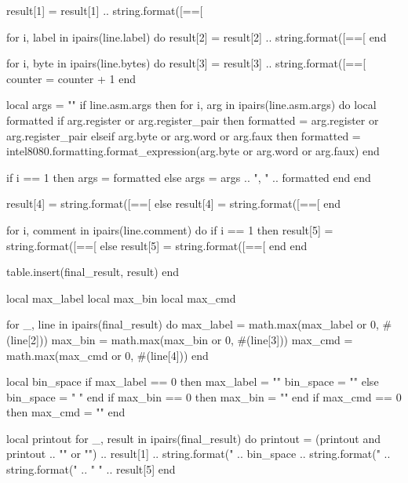         result[1] = result[1] .. string.format([==[%

        for i, label in ipairs(line.label) do
            result[2] = result[2] .. string.format([==[%
        end

        for i, byte in ipairs(line.bytes) do
            result[3] = result[3] .. string.format([==[%
            counter = counter + 1
        end

        local args = ""
        if line.asm.args then
            for i, arg in ipairs(line.asm.args) do
                local formatted
                if arg.register or arg.register_pair then
                    formatted = arg.register or arg.register_pair
                elseif arg.byte or arg.word or arg.faux then
                    formatted = intel8080.formatting.format_expression(arg.byte or arg.word or arg.faux)
                end

                if i == 1 then
                    args = formatted
                else
                    args = args .. ", " .. formatted
                end
            end

            result[4] = string.format([==[%
        else
            result[4] = string.format([==[%
        end

        for i, comment in ipairs(line.comment) do
            if i == 1 then
                result[5] = string.format([==[%
            else
                result[5] = string.format([==[ %
            end
        end

        table.insert(final_result, result)
    end

    local max_label
    local max_bin
    local max_cmd

    for _, line in ipairs(final_result) do
        max_label = math.max(max_label or 0, #(line[2]))
        max_bin = math.max(max_bin or 0, #(line[3]))
        max_cmd = math.max(max_cmd or 0, #(line[4]))
    end

    local bin_space
    if max_label == 0 then
        max_label = ""
        bin_space = ""
    else
        bin_space = "    "
    end
    if max_bin == 0 then
        max_bin = ""
    end
    if max_cmd == 0 then
        max_cmd = ""
    end

    local printout
    for _, result in ipairs(final_result) do
        printout = (printout and printout .. "\n" or "")
            .. result[1]
            .. string.format("    %
            .. bin_space
            .. string.format("%
            .. string.format("    %
            .. "    " .. result[5]
    end

